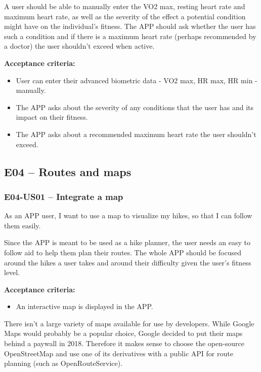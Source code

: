 A user should be able to manually enter the VO2 max, resting heart rate and maximum heart rate, as well as the severity of the effect a potential condition might have on the individual's fitness.
The APP should ask whether the user has such a condition and if there is a maximum heart rate (perhaps recommended by a doctor) the user shouldn't exceed when active.

\textbf{Acceptance criteria:}
\begin{itemize}
    \item User can enter their advanced biometric data - VO2 max, HR max, HR min - manually.
    \item The APP asks about the severity of any conditions that the user has and its impact on their fitness.
    \item The APP asks about a recommended maximum heart rate the user shouldn't exceed.
\end{itemize}


\subsection*{E04 -- Routes and maps}

\subsubsection*{E04-US01 -- Integrate a map}
As an APP user, I want to use a map to visualize my hikes, so that I can follow them easily.

Since the APP is meant to be used as a hike planner, the user needs an easy to follow aid to help them plan their routes.
The whole APP should be focused around the hikes a user takes and around their difficulty given the user's fitness level.

\textbf{Acceptance criteria:}
\begin{itemize}
    \item An interactive map is displayed in the APP.
\end{itemize}

There isn't a large variety of maps available for use by developers.
While Google Maps would probably be a popular choice, Google decided to put their maps behind a paywall\cite{google-maps-paywall} in 2018.
Therefore it makes sense to choose the open-source OpenStreetMap\cite{OpenStreetMap} and use one of its derivatives with a public API for route planning (such as OpenRouteService\cite{OpenRouteService}).

